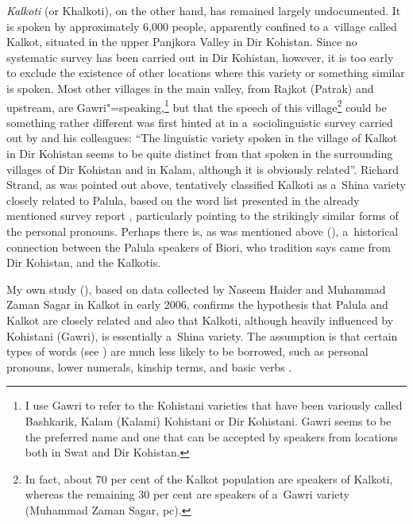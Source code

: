 \textit{Kalkoti} (or Khalkoti), on the other hand, has remained largely undocumented. It is spoken by approximately 6,000 people, apparently confined to a~village called Kalkot, situated in the upper Panjkora Valley in Dir Kohistan. Since no systematic survey has been carried out in Dir Kohistan, however, it is too early to exclude the existence of other locations where this variety or something similar is spoken. Most other villages in the main valley, from Rajkot (Patrak) and upstream, are Gawri"=speaking,\footnote{I use Gawri to refer to the Kohistani varieties that have been variously called Bashkarik, Kalam (Kalami) Kohistani or Dir Kohistani. Gawri seems to be the preferred name and one that can be accepted by speakers from locations both in Swat and Dir Kohistan.} but that the speech of this village\footnote{In fact, 
  about 70 per cent of the Kalkot population are speakers of Kalkoti, whereas the remaining 30 per cent are speakers of a~Gawri variety (Muhammad Zaman Sagar, pc).} could be something rather different was first hinted at in a~sociolinguistic survey carried out by \citet[7]{rensch1992} and his colleagues: ``The linguistic variety spoken in the village of Kalkot in Dir Kohistan seems to be quite distinct from that spoken in the surrounding villages of Dir Kohistan and in Kalam, although it is obviously related''. Richard Strand, as was pointed out above, tentatively classified Kalkoti as a~Shina variety closely related to Palula, based on the word list presented in the already mentioned survey report \citep[159--176]{rensch1992}, particularly pointing to the strikingly similar forms of the personal pronouns. Perhaps there is, as was mentioned above (), a~historical connection between the Palula speakers of Biori, who tradition says came from Dir Kohistan, and the Kalkotis.


My own study (\citealt{liljegren2013}), based on data collected by Naseem Haider and Muhammad Zaman Sagar in Kalkot in early 2006, confirms the hypothesis that Palula and Kalkot are closely related and also that Kalkoti, although heavily influenced by Kohistani (Gawri), is essentially a~Shina variety. The assumption is that certain types of words (see ) are much less likely to be borrowed, such as personal pronouns, lower numerals, kinship terms, and basic verbs \citep[23]{trask1996}.



